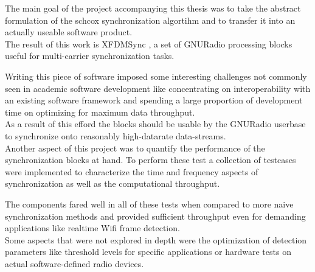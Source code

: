 The main goal of the project accompanying this thesis was
to take the abstract formulation of the \acrlong{schcox}
synchronization algortihm and to transfer it into an actually
useable software product. \\

The result of this work is XFDMSync \cite{xfdmsyncweb},
a set of GNURadio processing blocks useful for multi-carrier
synchronization tasks.

Writing this piece of software imposed some interesting
challenges not commonly seen in academic software development
like concentrating on interoperability with an existing
software framework and spending a large proportion of
development time on optimizing for maximum data throughput. \\

As a result of this efford the blocks should be usable
by the GNURadio userbase to synchronize onto
reasonably high-datarate data-streams. \\

Another aspect of this project was to quantify
the performance of the synchronization blocks at hand.
To perform these test a collection of testcases
were implemented to characterize the
time and frequency aspects of synchronization as
well as the computational throughput.

The components fared well in all of these tests
when compared to more naive synchronization
methods and provided sufficient throughput
even for demanding applications like realtime Wifi frame
detection. \\

Some aspects that were not explored in depth
were the optimization of detection parameters
like threshold levels for specific applications
or hardware tests on actual software-defined radio
devices.
